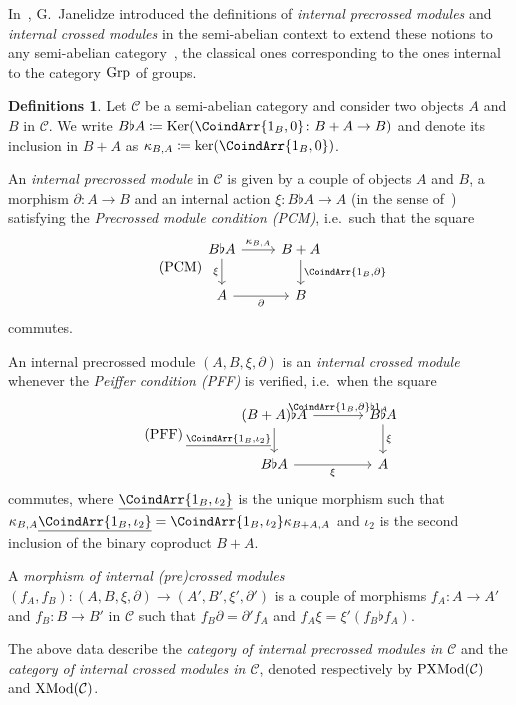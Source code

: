 \documentclass[a4paper, british, reqno]{amsart}
\DeclareMathOperator{\Ker}{Ker} %
\renewcommand*{\and}{,}
\renewcommand*{\and}{,}
\newcommand*{\CatSymb}[1]{\mathcal{#1}}
\newcommand*{\CatName}[1]{\textnormal{#1}}
\newcommand*{\CondName}[1]{\textnormal{(#1)}}
\newcommand*{\defn}[1]{\emph{#1}}
\newcommand*{\C}{\CatSymb{C}}
\newcommand*{\Grp}{\CatName{Grp}}
\newcommand*{\PXMod}{\CatName{PXMod}}
\newcommand*{\XMod}{\CatName{XMod}}
\newcommand*{\PCM}{\CondName{PCM}}
\newcommand*{\PFF}{\CondName{PFF}}
\theoremstyle{definition}
\newtheorem{definitions}[theorem]{Definitions}
\theoremstyle{remark}
\begin{document}
In~\cite{Jan03}, G.~Janelidze introduced the definitions of \defn{internal precrossed modules} and \defn{internal crossed modules} in the semi-abelian context to extend these notions to any semi-abelian category~\cite{JMT02}, the classical ones corresponding to the ones internal to the category \(\Grp\) of groups.

\begin{definitions}\label{def - (pre)crossed module}
	Let \(\C\) be a semi-abelian category and consider two objects \(A\) and \(B\) in \(\C\). We write \(B\flat A\coloneq \Ker(\CoindArr{1_B \and 0}\colon B+A\to B)\) and denote its inclusion in \(B+A\) as \(\kappa_{B,A}\coloneq \ker(\CoindArr{1_B\and 0})\).

	An \defn{internal precrossed module} in \(\C\) is given by a couple of objects \(A\) and \(B\), a morphism \(\partial \colon A\to B\) and an internal action \(\xi\colon B\flat A\to A\) (in the sense of~\cite{BJK05}) satisfying the \emph{Precrossed module condition \PCM{}}, i.e.\ such that the square
	\[
		\tag*{\PCM{}}
		\begin{tikzcd}
			B\flat A\arrow[d, "\xi" '] \arrow[r, "\kappa_{B,A}"] & B+A\arrow[d, "\CoindArr{1_B\and \partial}"] \\
			A\arrow[r, "\partial" ']                             & B
		\end{tikzcd}
	\]
	commutes.

	An internal precrossed module \((A,B,\xi,\partial)\) is an \defn{internal crossed module} whenever the \emph{Peiffer condition \PFF{}} is verified, i.e.\ when the square
	\[
		\tag*{\PFF{}}
		\begin{tikzcd}[column sep=large]
			(B+A)\flat A \arrow[r,"\CoindArr{1_B\and \partial}\flat 1_A"] \arrow[d, "\underline{\CoindArr{1_B\and \iota_2}}" '] & B\flat A\arrow[d,"\xi"] \\
			B\flat A \arrow[r,"\xi" ']                                                                                          & A
		\end{tikzcd}
	\]
	commutes, where \(\underline{\CoindArr{1_B\and \iota_2}}\) is the unique morphism such that \(\kappa_{B,A}\underline{\CoindArr{1_B\and \iota_2}}=\CoindArr{1_B\and \iota_2} \kappa_{B+A, A}\)  and \(\iota_2\) is the second inclusion of the binary coproduct \(B+A\).

	A \defn{morphism of internal (pre)crossed modules} \((f_A,f_B)\colon (A,B,\xi,\partial)\to (A',B',\xi',\partial')\) is a couple of morphisms \(f_A\colon A\to A'\) and \(f_B\colon B\to B'\) in \(\C\) such that \(f_B\partial = \partial' f_A\) and \(f_A \xi = \xi ' (f_B\flat f_A)\).

	The above data describe the \defn{category of internal precrossed modules in \(\C\)} and the \defn{category of internal crossed modules in \(\C\)}, denoted respectively by \(\PXMod(\C)\) and \(\XMod(\C)\).
\end{definitions}
\end{document}
